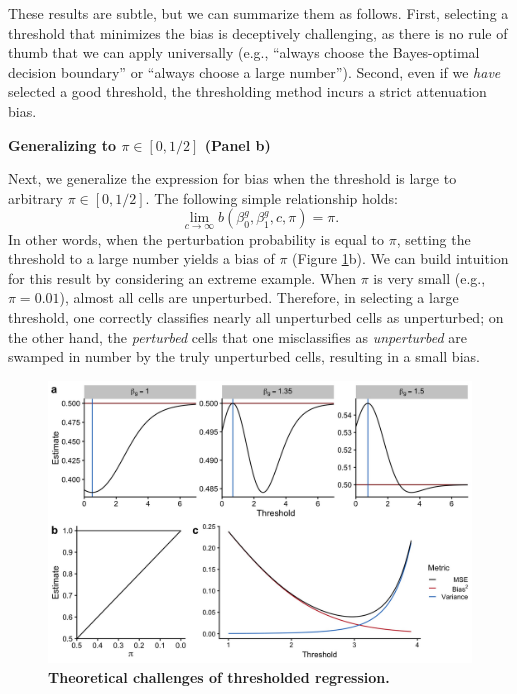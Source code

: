 \documentclass[12pt]{article}
\begin{document}
These results are subtle, but we can summarize them as follows. First, selecting a threshold that minimizes the bias is deceptively challenging, as there is no rule of thumb that we can apply universally (e.g., ``always choose the Bayes-optimal decision boundary'' or ``always choose a large number''). Second, even if we \textit{have} selected a good threshold, the thresholding method incurs a strict attenuation bias.

\begin{center}
\textbf{Generalizing to $\pi \in [0,1/2]$ (Panel b)}
\end{center}

Next, we generalize the expression for bias when the threshold is large to arbitrary $\pi \in [0,1/2]$. The following simple relationship holds:
$$ \lim_{ c \to \infty } b(\beta^g_0, \beta^g_1, c, \pi) = \pi.$$ In other words, when the perturbation probability is equal to $\pi$, setting the threshold to a large number yields a bias of $\pi$ (Figure \ref{thresholding_theoretical}b). We can build intuition for this result by considering an extreme example. When $\pi$ is very small (e.g., $\pi = 0.01$), almost all cells are unperturbed. Therefore, in selecting a large threshold, one correctly classifies nearly all unperturbed cells as unperturbed; on the other hand, the \textit{perturbed} cells that one misclassifies as \textit{unperturbed} are swamped in number by the truly unperturbed cells, resulting in a small bias.

\begin{figure}[h!]
	\centering
	\includegraphics[width=1\linewidth]{../../figures/thresholding_theoretical/plot}
	\caption{\textbf{Theoretical challenges of thresholded regression.}}
	\label{thresholding_theoretical}
\end{figure}
\end{document}
